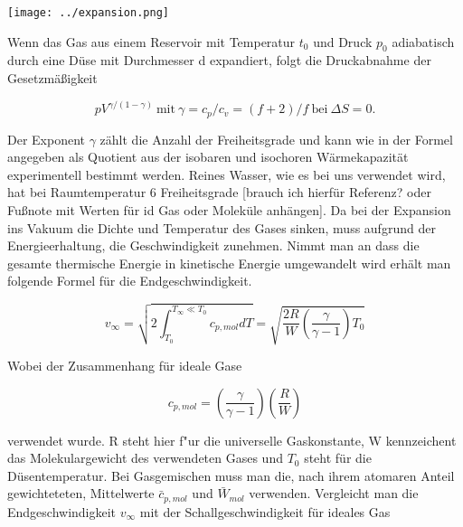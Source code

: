 \begin{center}
\begin{minipage}{\linewidth}
\centering
\texttt{[image: ../expansion.png]}%
 \label{fig:Machexpansion}
\end{minipage} 
\end{center} 

Wenn das Gas aus einem Reservoir mit Temperatur $t_0$ und Druck $p_0$ adiabatisch durch eine Düse mit Durchmesser d expandiert, folgt die Druckabnahme der Gesetzmäßigkeit

\begin{equation}
pV^{\gamma/(1-\gamma)}\ \mbox{mit}\ \gamma=c_p/c_v=(f+2)/f \ \mbox{bei} \ \Delta S=0.
\end{equation}

Der Exponent $\gamma$ zählt die Anzahl der Freiheitsgrade und kann wie in der Formel angegeben als Quotient aus der isobaren und isochoren Wärmekapazität experimentell bestimmt werden. Reines Wasser, wie es bei uns verwendet wird, hat bei Raumtemperatur 6 Freiheitsgrade [brauch ich hierfür Referenz? oder Fußnote mit Werten für id Gas oder Moleküle anhängen]. 
Da bei der Expansion ins Vakuum die Dichte und Temperatur des Gases sinken, muss aufgrund der Energieerhaltung, die Geschwindigkeit zunehmen. 
Nimmt man an dass die gesamte thermische Energie in kinetische Energie umgewandelt wird erhält man folgende Formel für die Endgeschwindigkeit.

\begin{equation}
v_\infty=\sqrt{2\int_{T_0}^{T_\infty \ll T_0} c_{p,mol}dT}= \sqrt{\frac{2R}{W}\left(\frac{\gamma}{\gamma-1}\right)T_0}
\end{equation}

Wobei der Zusammenhang für ideale Gase

\begin{equation}
c_{p,mol}= \left(\frac{\gamma}{\gamma-1}\right)\left(\frac{R}{W}\right)
\end{equation}

verwendet wurde. R steht hier f"ur die universelle Gaskonstante, W kennzeichent das Molekulargewicht des verwendeten Gases und $T_0$ steht für die Düsentemperatur.
Bei Gasgemischen muss man die, nach ihrem atomaren Anteil gewichteteten, Mittelwerte $\bar{c}_{p,mol}$ und $\bar{W}_{mol}$ verwenden.
Vergleicht man die Endgeschwindigkeit $v_{\infty}$ mit der Schallgeschwindigkeit für ideales Gas

